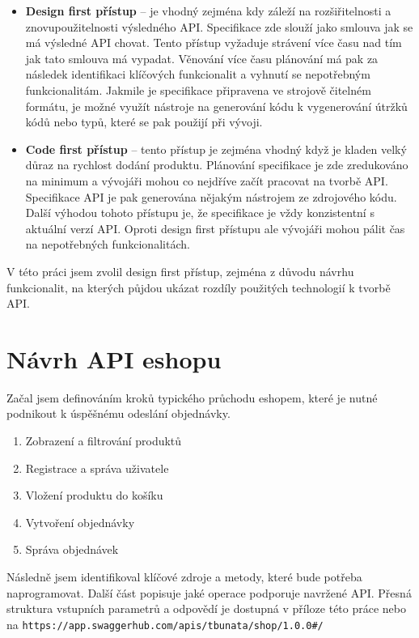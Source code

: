 \documentclass[thesis=M,czech]{FITthesis}[2019/12/23]
\begin{document}
\begin{itemize}
  \item \textbf{Design first přístup} -- je vhodný zejména kdy záleží na rozšiřitelnosti a znovupoužitelnosti výsledného API. Specifikace zde slouží jako smlouva jak se má výsledné API chovat. Tento přístup vyžaduje strávení více času nad tím jak tato smlouva má vypadat. Věnování více času plánování má pak za následek identifikaci klíčových funkcionalit a vyhnutí se nepotřebným funkcionalitám. Jakmile je specifikace připravena ve strojově čitelném formátu, je možné využít nástroje na generování kódu k vygenerování útržků kódů nebo typů, které se pak použijí při vývoji.
  \item \textbf{Code first přístup} -- tento přístup je zejména vhodný když je kladen velký důraz na rychlost dodání produktu. Plánování specifikace je zde zredukováno na minimum a vývojáři mohou co nejdříve začít pracovat na tvorbě API. Specifikace API je pak generována nějakým nástrojem ze zdrojového kódu. Další výhodou tohoto přístupu je, že specifikace je vždy konzistentní s aktuální verzí API. Oproti design first přístupu ale vývojáři mohou pálit čas na nepotřebných funkcionalitách.
\end{itemize}

V této práci jsem zvolil design first přístup, zejména z důvodu návrhu funkcionalit, na kterých půjdou ukázat rozdíly použitých technologií k tvorbě API.

\section{Návrh API eshopu}

Začal jsem definováním kroků typického průchodu eshopem, které je nutné podnikout k úspěšnému odeslání objednávky.

\begin{enumerate}
  \item Zobrazení a filtrování produktů
  \item Registrace a správa uživatele
  \item Vložení produktu do košíku
  \item Vytvoření objednávky
  \item Správa objednávek
\end{enumerate}

Následně jsem identifikoval klíčové zdroje a metody, které bude potřeba naprogramovat. Další část popisuje jaké operace podporuje navržené API. Přesná struktura vstupních parametrů a odpovědí je dostupná v příloze této práce nebo na \texttt{https://app.swaggerhub.com/apis/tbunata/shop/1.0.0#/}
\end{document}
